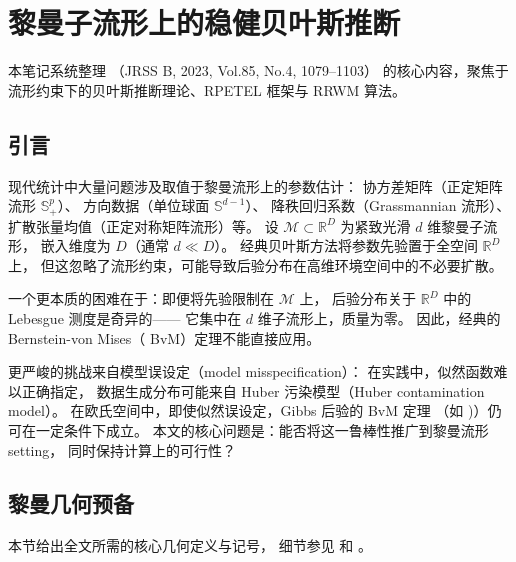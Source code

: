\chapter{黎曼子流形上的稳健贝叶斯推断}\label{ch:chapter1}

本笔记系统整理 \citep{tang2023robust}（JRSS B, 2023, Vol.85, No.4, 1079--1103）
的核心内容，聚焦于流形约束下的贝叶斯推断理论、RPETEL 框架与 RRWM 算法。

\section{引言}\label{sec:ch1-intro}

现代统计中大量问题涉及取值于黎曼流形上的参数估计：
协方差矩阵（正定矩阵流形 $\mathbb{S}_{+}^p$）、
方向数据（单位球面 $\mathbb{S}^{d-1}$）、
降秩回归系数（Grassmannian 流形）、
扩散张量均值（正定对称矩阵流形）等。
设 $\mathcal{M}\subset\mathbb{R}^D$ 为紧致光滑 $d$ 维黎曼子流形，
嵌入维度为 $D$（通常 $d\ll D$）。
经典贝叶斯方法将参数先验置于全空间 $\mathbb{R}^D$ 上，
但这忽略了流形约束，可能导致后验分布在高维环境空间中的不必要扩散。

一个更本质的困难在于：即便将先验限制在 $\mathcal{M}$ 上，
后验分布关于 $\mathbb{R}^D$ 中的 Lebesgue 测度是奇异的——
它集中在 $d$ 维子流形上，质量为零。
因此，经典的 Bernstein-von Mises（ BvM）定理不能直接应用。

更严峻的挑战来自模型误设定（model misspecification）：
在实践中，似然函数难以正确指定，
数据生成分布可能来自 Huber 污染模型（Huber contamination model）。
在欧氏空间中，即使似然误设定，Gibbs 后验的 BvM 定理
（如 \citep{kleijn2012bv})）仍可在一定条件下成立。
本文的核心问题是：能否将这一鲁棒性推广到黎曼流形 setting，
同时保持计算上的可行性？

\section{黎曼几何预备}\label{sec:ch1-riemannian-prelim}

本节给出全文所需的核心几何定义与记号，
细节参见 \citep[Appendix A]{tang2023robust} 和 \citep{boumal2023intro}。


